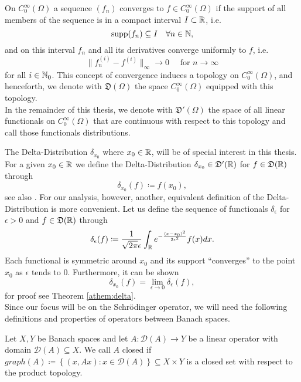 \begin{definition}[Distributions]
	On $C_{0}^{\infty}(\Omega)$ a sequence $(f_{n})$ converges to $f \in C_{0}^{\infty}(\Omega)$ if the support of all members of the sequence is in a compact interval $I \subset \mathbb{R}$, i.e.
	$$ \operatorname{supp} (f_{n}) \subseteq I \quad \forall n \in \mathbb{N}, $$
	and on this interval $f_{n}$ and all its derivatives converge uniformly to $f$, i.e.
	\[ \| f_{n}^{(i)} - f^{(i)} \|_{\infty} \rightarrow 0 \quad \text{ for } n \rightarrow \infty \]
	for all $i \in \mathbb{N}_{0}$. This concept of convergence induces a topology on $C_{0}^{\infty}(\Omega)$, and henceforth, we denote with $\mathfrak{D}(\Omega)$ the space $C_{0}^{\infty}(\Omega)$ equipped with this topology.
~\\

	In the remainder of this thesis, we denote with $\mathfrak{D}'(\Omega)$ the space of all linear functionals on $C_{0}^{\infty}(\Omega)$ that are continuous with respect to this topology and call those functionals distributions.  
\end{definition}

The Delta-Distribution $\delta_{x_{0}}$ where $x_{0} \in \mathbb{R}$, will be of special interest in this thesis. For a given $x_{0} \in \mathbb{R}$ we define the Delta-Distribution $\delta_{x_{0}} \in \mathfrak{D}'(\mathbb{R})$ for $f \in \mathfrak{D}(\mathbb{R})$ through
		\[  \delta_{x_{0}}(f) \coloneqq f(x_{0}), \]
	see also \cite[p. 429]{werner2006funkana}. For our analysis, however, another, equivalent definition of the Delta-Distribution is more convenient. Let us define the sequence of functionals $\delta_{\epsilon}$ for $\epsilon > 0$ and $f \in \mathfrak{D}(\mathbb{R})$ through
	\begin{equation}
		\delta_{\epsilon}(f) \coloneqq \frac{1}{\sqrt{2 \pi} \epsilon} \int_{\mathbb{R}} e^{-\frac{(x - x_{0})^{2}}{2 \epsilon^{2}}} f(x) dx. \label{eq:2.1-smooth_potential}
	\end{equation}
 	Each functional is symmetric around $x_{0}$ and its support \enquote{converges} to the point $x_{0}$ as $\epsilon$ tends to $0$. Furthermore, it can be shown 
 	\[ \delta_{x_{0}}(f) = \lim_{\epsilon \rightarrow 0} \delta_{\epsilon}(f), \]
 	for proof see Theorem \ref{athem:delta}.
~\\

Since our focus will be on the Schrödinger operator, we will need the following definitions and properties of operators between Banach spaces.
\begin{definition} 
Let $X, Y$ be Banach spaces and let $A \colon \mathcal{D}(A) \rightarrow Y$ be a linear operator with domain $\mathcal{D}(A) \subseteq X$. We call $A$ closed if $graph(A) \coloneqq \left\{ (x, Ax) : x \in \mathcal{D}(A) \right\} \subseteq X \times Y$ is a closed set with respect to the product topology.
\end{definition}

